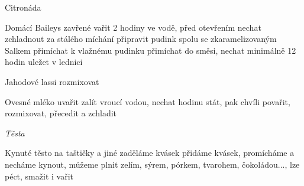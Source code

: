 \documentclass[12pt,a4paper]{article}
\begin{document}
\begin{recipe}{Citronáda}
\end{recipe}
\newpage

\begin{recipe}{Domácí Baileys}
   zavřené vařit 2 hodiny ve vodě, před otevřením nechat zchladnout
   za stálého míchání připravit pudink
   spolu se zkaramelizovaným Salkem přimíchat k vlažnému pudinku
   přimíchat do směsi, nechat minimálně 12 hodin uležet v lednici
\end{recipe}
\newpage

\begin{recipe}{Jahodové lassi}
   rozmixovat
\end{recipe}
\newpage

\begin{recipe}{Ovesné mléko}
   uvařit
   zalít vroucí vodou, nechat hodinu stát, pak chvíli povařit, rozmixovat, přecedit a zchladit
\end{recipe}
\newpage

\vspace*{\fill}
\hfill {\Huge\it Těsta}\hfill
\vspace*{\fill}
\newpage

\begin{recipe}{Kynuté těsto na taštičky a jiné}
   zaděláme kvásek
   přidáme kvásek, promícháme a necháme kynout, můžeme plnit zelím, sýrem, pórkem, tvarohem, čokoládou..., lze péct, smažit i vařit
\end{recipe}
\newpage
\end{document}

